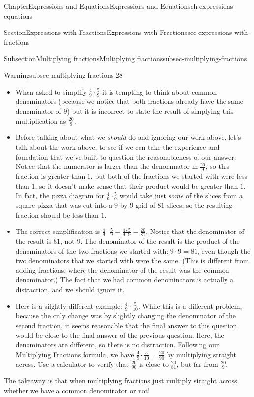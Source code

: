 \documentclass[twoside,11pt,]{book}
\numberwithin{equation}{chapter}
\begin{document}
\begin{chapterptx}{Chapter}{Expressions and Equations}{}{Expressions and Equations}{}{}{ch-expressions-equations}
\begin{sectionptx}{Section}{Expressions with Fractions}{}{Expressions with Fractions}{}{}{sec-expressions-with-fractions}
\begin{subsectionptx}{Subsection}{Multiplying fractions}{}{Multiplying fractions}{}{}{subsec-multiplying-fractions}
\begin{warning}{Warning}{}{subsec-multiplying-fractions-28}
\begin{itemize}[label=\textbullet]
\item{}When asked to simplify \(\frac{4}{9} \cdot \frac{5}{9}\) it is tempting to think about common denominators (because we notice that both fractions already have the same denominator of \(9\)) but it is incorrect to state the result of simplying this multiplication as \(\frac{20}{9}\).%
\item{}Before talking about what we \emph{should} do and ignoring our work above, let's talk about the work above, to see if we can take the experience and foundation that we've built to question the reasonableness of our answer: Notice that the numerator is larger than the denominator in \(\frac{20}{9}\), so this fraction is greater than \(1\), but both of the fractions we started with were less than \(1\), so it doesn't make sense that their product would be greater than \(1\). In fact, the pizza diagram for \(\frac{4}{9} \cdot \frac{5}{9}\) would take just \emph{some} of the slices from a square pizza that was cut into a \(9\)-by-\(9\) grid of \(81\) slices, so the resulting fraction should be less than \(1\).%
\item{}The correct simplification is \(\frac{4}{9} \cdot \frac{5}{9} = \frac{4 \cdot 5}{9 \cdot 9} = \frac{20}{81}\). Notice that the denominator of the result is \(81\), not \(9\). The denominator of the result is the product of the denominators of the two fractions we started with: \(9 \cdot 9 = 81\), even though the two denominators that we started with were the same. (This is different from adding fractions, where the denominator of the result was the common denominator.) The fact that we had common denominators is actually a distraction, and we should ignore it.%
\item{}Here is a silghtly different example: \(\frac{4}{9} \cdot \frac{5}{10}\). While this is a different problem, because the only change was by slightly changing the denominator of the second fraction, it seems reasonable that the final answer to this question would be close to the final answer of the previous question. Here, the denominators are different, so there is no distraction. Following our Multiplying Fractions formula, we have \(\frac{4}{9} \cdot \frac{5}{10} = \frac{20}{90}\) by multiplying straight across. Use a calculator to verify that \(\frac{20}{90}\) is close to \(\frac{20}{81}\), but far from \(\frac{20}{9}\).%
\end{itemize}
The takeaway is that when multiplying fractions just multiply straight across whether we have a common denominator or not!%
\end{warning}

\end{subsectionptx}
\end{sectionptx}
\end{chapterptx}
\end{document}
